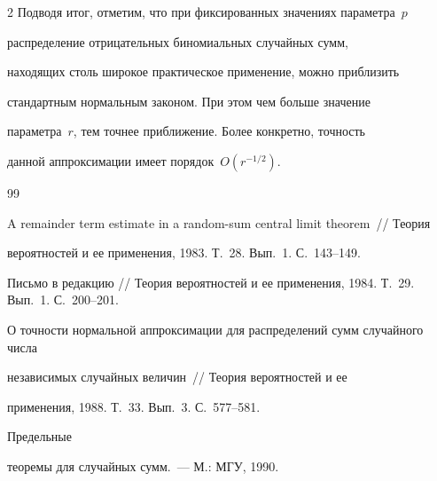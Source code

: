 \begin{multicols}{2}
Подводя итог, отметим, что при фиксированных значениях параметра~$p$ 


распределение отрицательных биномиальных случайных сумм,


находящих столь широкое практическое применение, можно приблизить


стандартным нормальным законом. При этом чем больше значение


параметра~$r$, тем точнее приближение. Более конкретно, точность


данной аппроксимации имеет порядок~$O\left(r^{-1/2}\right)$.








{\small\frenchspacing


{%




\begin{thebibliography}{99}







 A remainder term estimate in a random-sum central limit theorem~// Теория


вероятностей и ее применения, 1983. Т.~28. Вып.~1. С.~143--149.


Письмо в редакцию // Теория вероятностей и ее применения, 1984. Т.~29. Вып.~1. С.~200--201.









О точности нормальной аппроксимации для распределений сумм случайного числа


 независимых случайных величин~// Теория вероятностей и ее


применения, 1988. Т.~33. Вып.~3. С.~577--581.









Предельные


теоремы для случайных сумм.~--- М.: МГУ, 1990.








\end{thebibliography}}}
\end{multicols}
